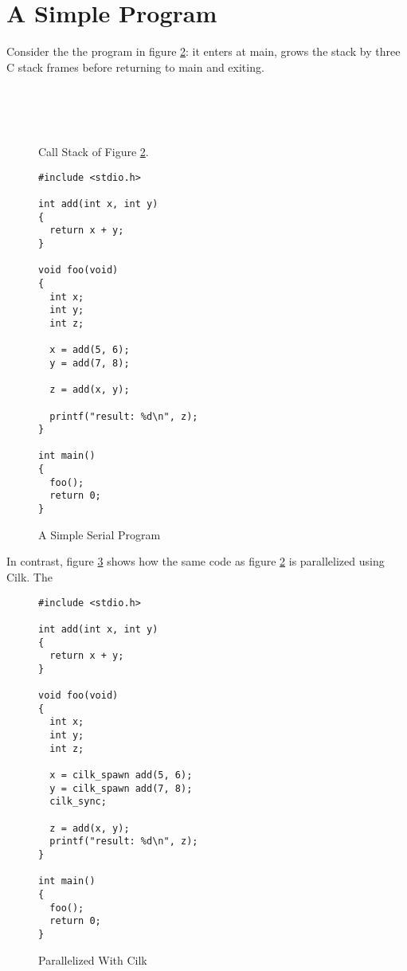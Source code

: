 

\section{A Simple Program}\label{s:prog_simple}

Consider the the program in figure \ref{fig:prog1_serial}: it enters at main, grows the stack by
three C stack frames before returning to main and exiting. 

\begin{figure}[H]
\centering
{}\\
\\
\\
\caption{Call Stack of Figure \ref{fig:prog1_serial}.}
\label{fig:prog1_stack_serial}
\end{figure}


\begin{figure}[H]
\centering
\begin{lstlisting}
#include <stdio.h>

int add(int x, int y)
{
  return x + y;
}

void foo(void)
{
  int x;
  int y;
  int z;

  x = add(5, 6);
  y = add(7, 8);

  z = add(x, y);

  printf("result: %d\n", z);
}

int main() 
{ 
  foo();
  return 0;
}
\end{lstlisting}
\caption{A Simple Serial Program}
\label{fig:prog1_serial}
\end{figure}

In contrast, figure \ref{fig:prog1_parallel} shows how the same code as figure
\ref{fig:prog1_serial} is parallelized using Cilk. The 

\begin{figure}[H]
\centering
\begin{lstlisting}
#include <stdio.h>

int add(int x, int y)
{
  return x + y;
}

void foo(void)
{
  int x;
  int y;
  int z;

  x = cilk_spawn add(5, 6);
  y = cilk_spawn add(7, 8);
  cilk_sync;

  z = add(x, y);
  printf("result: %d\n", z);
}

int main() 
{ 
  foo();
  return 0;
}
\end{lstlisting}
\caption{Parallelized With Cilk}
\label{fig:prog1_parallel}
\end{figure}



